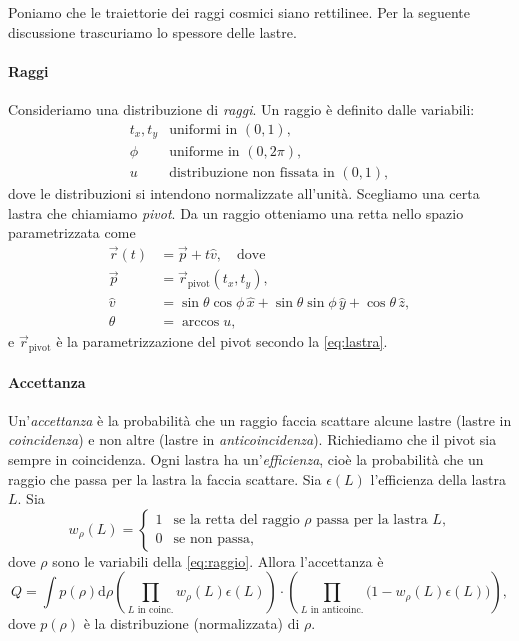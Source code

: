 Poniamo che le traiettorie dei raggi cosmici siano rettilinee.
Per la seguente discussione trascuriamo lo spessore delle lastre.

\paragraph{Raggi}

Consideriamo una distribuzione di \emph{raggi}.
Un raggio è definito dalle variabili:
\begin{equation}
	\label{eq:raggio}
	\begin{array}{ll}
		t_x, t_y & \text{uniformi in $(0,1)$}, \\
		\phi     & \text{uniforme in $(0,2\pi)$}, \\
		u        & \text{distribuzione non fissata in $(0,1)$},
	\end{array}
\end{equation}
dove le distribuzioni si intendono normalizzate all'unità.
Scegliamo una certa lastra che chiamiamo \emph{pivot}.
Da un raggio otteniamo una retta nello spazio parametrizzata come
\begin{align*}
	\vec r(t) &= \vec p + t \hat v, \quad \text{dove} \\
	\vec p    &= \vec r_\text{pivot}(t_x, t_y), \\
	\hat v    &= \sin\theta\cos\phi\,\hat x + \sin\theta\sin\phi\,\hat y + \cos\theta\,\hat z, \\
	\theta    &= \arccos u,
\end{align*}
e $\vec r_\text{pivot}$ è la parametrizzazione del pivot secondo la \eqref{eq:lastra}.

\paragraph{Accettanza}

Un'\emph{accettanza} è la probabilità che un raggio
faccia scattare alcune lastre (lastre in \emph{coincidenza})
e non altre (lastre in \emph{anticoincidenza}).
Richiediamo che il pivot sia sempre in coincidenza.
Ogni lastra ha un'\emph{efficienza},
cioè la probabilità che un raggio che passa per la lastra la faccia scattare.
Sia $\epsilon(L)$ l'efficienza della lastra $L$.
Sia
\begin{equation*}
	w_\rho(L) = \begin{cases}
		1 & \text{se la retta del raggio $\rho$ passa per la lastra $L$,} \\
		0 & \text{se non passa,}
	\end{cases}
\end{equation*}
dove $\rho$ sono le variabili della \eqref{eq:raggio}.
Allora l'accettanza è
\begin{equation}
	\label{eq:acc}
	Q = \int p(\rho) \mathrm{d} \rho
	\left( \prod_\text{$L$ in coinc.} w_\rho(L) \epsilon(L) \right)
	\cdot \left( \prod_\text{$L$ in anticoinc.} \big(1 - w_\rho(L) \epsilon(L)\big) \right),
\end{equation}
dove $p(\rho)$ è la distribuzione (normalizzata) di $\rho$.

